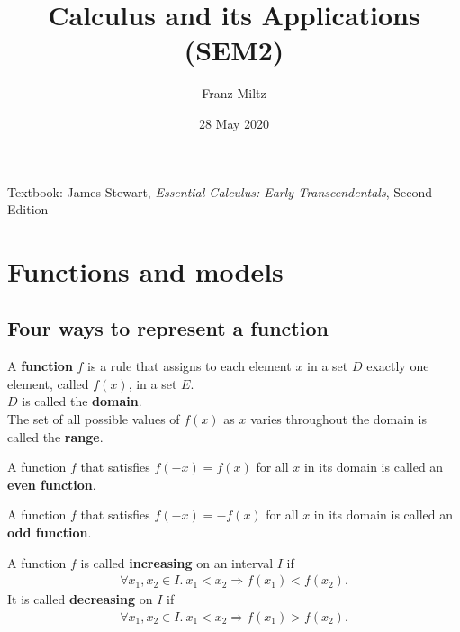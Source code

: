 \documentclass{article}
\begin{document}
\title{Calculus and its Applications (SEM2)}
\author{Franz Miltz}
\date{28 May 2020}
\maketitle
Textbook: James Stewart, \emph{Essential Calculus: Early Transcendentals}, Second Edition
\tableofcontents
\pagebreak
\section{Functions and models}
\subsection{Four ways to represent a function}
\begin{definition}
	A \textbf{function} $f$ is a rule that assigns to each element $x$ in a set $D$ exactly one element, called $f(x)$, in a set $E$.\\
	$D$ is called the \textbf{domain}.\\
	The set of all possible values of $f(x)$ as $x$ varies throughout the domain is called the \textbf{range}.\\
\end{definition}
\begin{definition}
	A function $f$ that satisfies $f(-x)=f(x)$ for all $x$ in its domain is called an \textbf{even function}.
\end{definition}
\begin{definition}
	A function $f$ that satisfies $f(-x)=-f(x)$ for all $x$ in its domain is called an \textbf{odd function}.
\end{definition}
\begin{definition}
	A function $f$ is called \textbf{increasing} on an interval $I$ if
	\begin{align*}
		\forall x_1, x_2 \in I.\:x_1 < x_2 \Rightarrow f(x_1) < f(x_2).
	\end{align*}
	It is called \textbf{decreasing} on $I$ if
	\begin{align*}
		\forall x_1, x_2 \in I.\: x_1 < x_2 \Rightarrow f(x_1) > f(x_2).
	\end{align*}
\end{definition}
\end{document}

